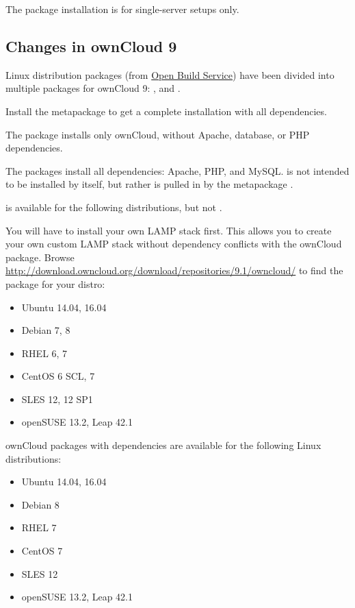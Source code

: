 \documentclass[letterpaper,10pt,english]{sphinxmanual}
\begin{document}
The package installation is for single-server setups only.


\subsection{Changes in ownCloud 9}
\label{installation/linux_installation:changes-in-owncloud-9}
Linux distribution packages (from \href{https://download.owncloud.org/download/repositories/9.2/owncloud/}{Open Build Service}) have been divided into
multiple packages for ownCloud 9: ,  and .

Install the metapackage  to get a complete installation with all dependencies.

The  package installs only ownCloud, without Apache, database,
or PHP dependencies.

The  packages install all dependencies: Apache, PHP, and MySQL.
 is not intended to be installed by itself, but rather is
pulled in by the metapackage .

 is available for the following distributions, but not
.

You will have to install your own LAMP stack first. This
allows you to create your own custom LAMP stack without dependency conflicts
with the ownCloud package. Browse
\href{http://download.owncloud.org/download/repositories/9.1/owncloud/}{http://download.owncloud.org/download/repositories/9.1/owncloud/} to find
the  package for your distro:
\begin{itemize}
\item {} 
Ubuntu 14.04, 16.04

\item {} 
Debian 7, 8

\item {} 
RHEL 6, 7

\item {} 
CentOS 6 SCL, 7

\item {} 
SLES 12, 12 SP1

\item {} 
openSUSE 13.2, Leap 42.1

\end{itemize}

ownCloud packages with dependencies are available for the following Linux distributions:
\begin{itemize}
\item {} 
Ubuntu 14.04, 16.04

\item {} 
Debian 8

\item {} 
RHEL 7

\item {} 
CentOS 7

\item {} 
SLES 12

\item {} 
openSUSE 13.2, Leap 42.1

\end{itemize}
\end{document}
